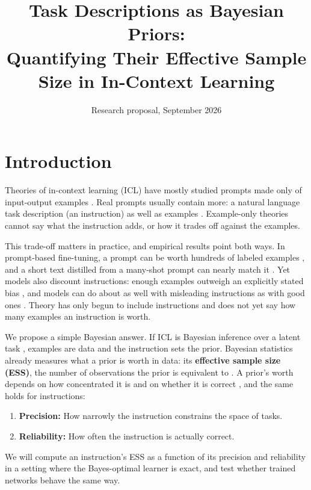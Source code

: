 \documentclass[10pt,letterpaper]{article}
\title{\vspace{-2.2em}\large\bfseries Task Descriptions as Bayesian Priors:\\Quantifying Their Effective Sample Size in In-Context Learning\vspace{-0.4em}}
\author{\normalsize Research proposal, September 2026}
\date{}
\begin{document}
\maketitle
\vspace{-2.4em}

\section{Introduction}
Theories of in-context learning (ICL) have mostly studied prompts made only of input-output examples \citep{garg2022,akyurek2023,xie2022,genewein2025}. Real prompts usually contain more: a natural language task description (an instruction) as well as examples \citep{brown2020,lin2025}. Example-only theories cannot say what the instruction adds, or how it trades off against the examples.

This trade-off matters in practice, and empirical results point both ways. In prompt-based fine-tuning, a prompt can be worth hundreds of labeled examples \citep{lescao2021}, and a short text distilled from a many-shot prompt can nearly match it \citep{honda2025}. Yet models also discount instructions: enough examples outweigh an explicitly stated bias \citep{gupta2025}, and models can do about as well with misleading instructions as with good ones \citep{webson2022}. Theory has only begun to include instructions \citep{huangge2025,lin2025,xuanyuan2025,tong2026} and does not yet say how many examples an instruction is worth.

We propose a simple Bayesian answer. If ICL is Bayesian inference over a latent task \citep{xie2022}, examples are data and the instruction sets the prior. Bayesian statistics already measures what a prior is worth in data: its \textbf{effective sample size (ESS)}, the number of observations the prior is equivalent to \citep{morita2008}. A prior's worth depends on how concentrated it is and on whether it is correct \citep{evans2006}, and the same holds for instructions:
\begin{enumerate}
\item \textbf{Precision:} How narrowly the instruction constrains the space of tasks.
\item \textbf{Reliability:} How often the instruction is actually correct.
\end{enumerate}

We will compute an instruction's ESS as a function of its precision and reliability in a setting where the Bayes-optimal learner is exact, and test whether trained networks behave the same way.
\end{document}
